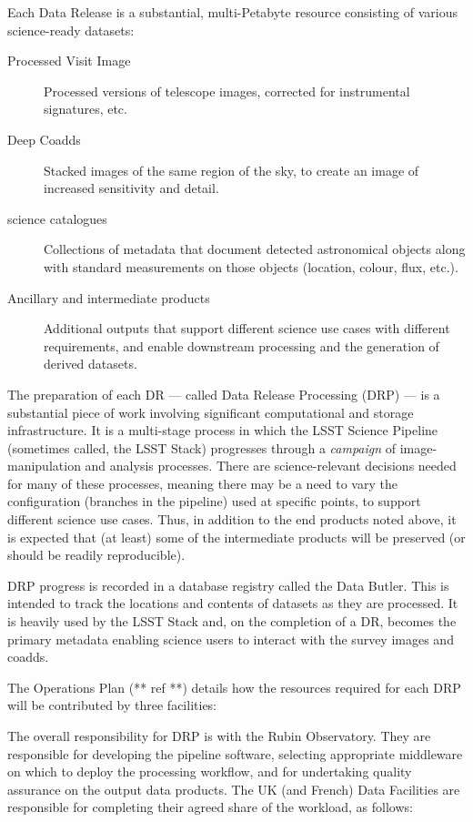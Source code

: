 Each Data Release is a substantial, multi-Petabyte resource consisting of various science-ready datasets:

\begin{description}

\item[Processed Visit Image] Processed versions of telescope images, corrected for instrumental signatures, etc.

\item[Deep Coadds] Stacked images of the same region of the sky, to create an image of increased sensitivity and detail.

\item[science catalogues] Collections of metadata that document detected astronomical objects along with standard measurements on those objects (location, colour, flux, etc.).

\item[Ancillary and intermediate products] Additional outputs that support different science use cases with different requirements, and enable downstream processing and the generation of derived datasets.

\end{description}

The preparation of each DR --- called Data Release Processing (DRP) --- is a substantial piece of work involving significant computational and storage infrastructure. It is a multi-stage process in which the LSST Science Pipeline (sometimes called, the LSST Stack) progresses through a {\em campaign} of image-manipulation and analysis processes. There are science-relevant decisions needed for many of these processes, meaning there may be a need to vary the configuration (branches in the pipeline) used at specific points, to support different science use cases. Thus, in addition to the end products noted above, it is expected that (at least) some of the intermediate products will be preserved (or should be readily reproducible).

DRP progress is recorded in a database registry called the Data Butler. This is intended to track the locations and contents of datasets as they are processed. It is heavily used by the LSST Stack and, on the completion of a DR, becomes the primary metadata enabling science users to interact with the survey images and coadds.

The Operations Plan (** ref **) details how the resources required for each DRP will be contributed by three facilities:

The overall responsibility for DRP is with the Rubin Observatory. They are responsible for developing the pipeline software, selecting appropriate middleware on which to deploy the processing workflow, and for undertaking quality assurance on the output data products. The UK (and French) Data Facilities are responsible for completing their agreed share of the workload, as follows:

